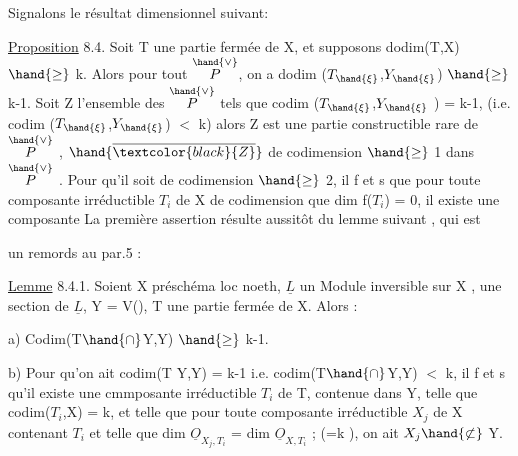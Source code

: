 Signalons le résultat dimensionnel suivant:

\uline{Proposition} 8.4. Soit T une partie fermée de X, et supposons
dodim(T,X) $\hand{\geq}$ k. Alors pour tout \hand{$\xi\in$}$\overset{\hand{\vee}}{P}$, on a dodim ($T_{\hand{\xi}}$,$Y_{\hand{\xi}}$) $\hand{\geq}$ k-1. Soit
Z l'ensemble des \hand{$\xi\in$} $\overset{\hand{\vee}}{P}$ tels que codim ($T_{\hand{\xi}}$,$Y_{\hand{\xi}}$ ) = k-1, (i.e.
codim ($T_{\hand{\xi}}$,$Y_{\hand{\xi}}$) $<$ k) alors Z est une partie constructible rare de $\overset{\hand{\vee}}{P}$ ,
 $\hand{\overline{\textcolor{black}{Z}}}$  de codimension $\hand{\geq}$ 1 dans $\overset{\hand{\vee}}{P}$ . Pour qu'il soit de
codimension $\hand{\geq}$ 2, il f et s que pour toute composante irréductible
$T_i$ de X de codimension  
que dim f($T_i$) = 0, il existe une composante 
La première assertion résulte aussitôt du lemme suivant , qui est

un remords au par.5 :

\uline{Lemme} 8.4.1. Soient X préschéma loc noeth, $\underline{L}$ un Module inversible sur
X , \hand{$\phi$} une section de $\underline{L}$, Y = V(\hand{$\phi$}), T une partie fermée de X.  Alors :

a) Codim(T$\hand{\cap}$Y,Y) $\hand{\geq}$ k-1.

b) Pour qu'on ait codim(T Y,Y) = k-1 i.e. codim(T$\hand{\cap}$Y,Y) $<$ k, il
f et s qu'il existe une cmmposante irréductible $T_i$ de T, contenue dans
Y,  telle que codim($T_i$,X) = k, et telle que pour toute composante
irréductible $X_j$ de X  contenant $T_i$ et telle que dim $\underline{O}_{X_j,T_i}$ =
dim $\underline{O}_{X,T_i}$ ; (=k ), on ait $X_j \hand{\not\subset}$ Y.

